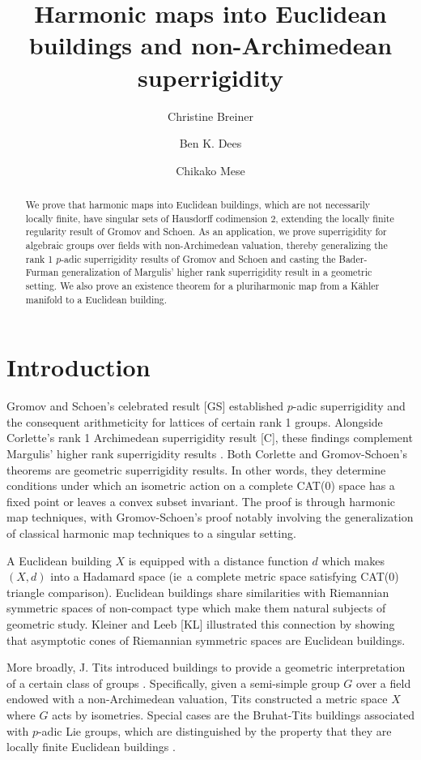 \documentclass[12pt]{amsart}
\title[Harmonic maps into Euclidean buildings]{Harmonic maps into Euclidean buildings and non-Archimedean superrigidity}
\author[Breiner]{Christine Breiner}
\author[Dees]{Ben K. Dees}
\author[Mese]{Chikako Mese}
\theoremstyle{definition}
\numberwithin{equation}{section}
\begin{document}
\maketitle

\begin{abstract}
We prove that harmonic maps into Euclidean buildings, which are not necessarily locally finite, have singular sets of Hausdorff codimension 2, extending the locally finite regularity result of Gromov and Schoen. As an application, we prove superrigidity for {algebraic groups over fields with non-Archimedean valuation}, thereby generalizing the rank 1 $p$-adic superrigidity results of Gromov and Schoen and casting the Bader-Furman generalization of Margulis' higher rank superrigidity result in a geometric setting.  We also prove an existence theorem for a pluriharmonic map from a K\"ahler manifold to a Euclidean building.
\end{abstract}

\section{Introduction}\label{sec:intro} 


Gromov and Schoen’s celebrated result [GS] established $p$-adic superrigidity and the consequent arithmeticity for lattices of certain rank 1 groups. Alongside Corlette’s rank 1 Archimedean superrigidity result [C], these findings complement Margulis’ higher rank superrigidity results \cite{margulis}. Both Corlette and Gromov-Schoen's theorems are geometric superrigidity results.  In other words, they determine conditions under which an isometric action on a complete CAT(0) space has a fixed point or leaves a convex subset invariant. The proof is through harmonic map techniques, with Gromov-Schoen’s proof notably involving the generalization of classical harmonic map techniques to a singular setting.


A Euclidean building $X$ is equipped with a distance function $d$ which makes $(X,d)$ into a Hadamard space (ie~a complete metric space satisfying CAT(0) triangle comparison).  Euclidean buildings share similarities with  Riemannian symmetric spaces of non-compact type which make them natural subjects of geometric study. Kleiner and Leeb [KL] illustrated this connection by showing that asymptotic cones of Riemannian symmetric spaces are Euclidean buildings.

More broadly, J. Tits introduced buildings to provide a geometric interpretation of a certain class of  groups \cite{tits}.
Specifically, given a semi-simple group $G$ over
a field endowed with a non-Archimedean valuation, Tits constructed a  metric space $X$  where $G$ acts by isometries.    
Special cases are the  Bruhat-Tits buildings associated with $p$-adic Lie groups, which are distinguished by the property that they are locally finite Euclidean buildings \cite{bruhat-tits}. 
\end{document}
